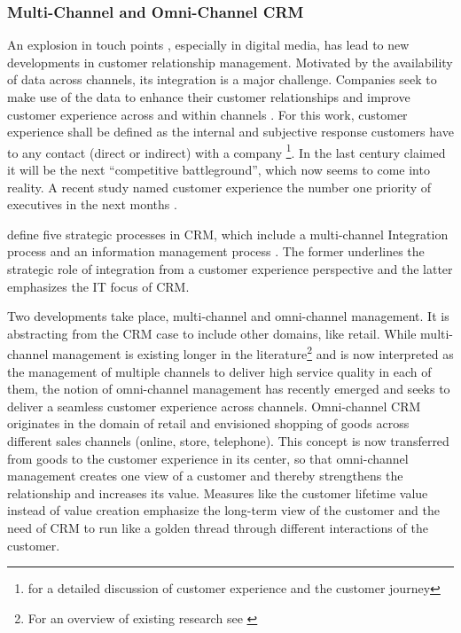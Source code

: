 	\subsubsection{Multi-Channel and Omni-Channel CRM}
		An explosion in touch points \citep{Lemon_2016}, especially in digital media, has lead to new developments in customer relationship management. Motivated by the availability of data across channels, its integration is a major challenge. Companies seek to make use of the data to enhance their customer relationships and improve customer experience across and within channels \citep{Frow_2007}. For this work, customer experience shall be defined as the internal and subjective response customers have to any contact (direct or indirect) with a company \citep{meyer2007customer}\footnote{\cf \cite{Lemon_2016} for a detailed discussion of customer experience and the customer journey }. In the last century \citeauthor{gilmore1998} claimed it will be the next \enquote{competitive battleground}, which now seems to come into reality. A recent study named customer experience the number one priority of executives in the next months \citep{acc2015ce}.
		
		\citeauthor{payne2004role} define five strategic processes in \acrshort{CRM}, which include a multi-channel Integration process and an information management process \citep{payne2004role}. The former underlines the strategic role of integration from a customer experience perspective and the latter emphasizes the IT focus of CRM. 
		
		Two developments take place, multi-channel and omni-channel management. It is abstracting from the CRM case to include other domains, like retail. While multi-channel management is existing longer in the literature\footnote{For an overview of existing research see \citep{Neslin_2009}} and is now interpreted as the management of multiple channels to deliver high service quality in each of them, the notion of omni-channel management has recently emerged and seeks to deliver a seamless customer experience across channels. Omni-channel CRM originates in the domain of retail \citep{Brynjolfsson20131, rigby2011, Piotrowicz_2014} and envisioned shopping of goods across different sales channels (\ie online, store, telephone). This concept is now transferred from goods to the customer experience in its center, so that omni-channel management creates one view of a customer and thereby strengthens the relationship and increases its value. Measures like the customer lifetime value instead of value creation emphasize the long-term view of the customer \citep{Lemon_2016} and the need of CRM to run like a golden thread through different interactions of the customer. %
		

